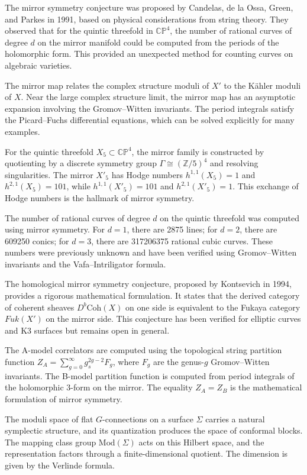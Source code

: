The mirror symmetry conjecture was proposed by Candelas, de la Ossa, Green, and Parkes in 1991, based on physical considerations from string theory. They observed that for the quintic threefold in $\mathbb{CP}^4$, the number of rational curves of degree $d$ on the mirror manifold could be computed from the periods of the holomorphic form. This provided an unexpected method for counting curves on algebraic varieties.

The mirror map relates the complex structure moduli of $X'$ to the K\"ahler moduli of $X$. Near the large complex structure limit, the mirror map has an asymptotic expansion involving the Gromov--Witten invariants. The period integrals satisfy the Picard--Fuchs differential equations, which can be solved explicitly for many examples.

For the quintic threefold $X_5 \subset \mathbb{CP}^4$, the mirror family is constructed by quotienting by a discrete symmetry group $\Gamma \cong (\mathbb{Z}/5)^4$ and resolving singularities. The mirror $X'_5$ has Hodge numbers $h^{1,1}(X_5) = 1$ and $h^{2,1}(X_5) = 101$, while $h^{1,1}(X'_5) = 101$ and $h^{2,1}(X'_5) = 1$. This exchange of Hodge numbers is the hallmark of mirror symmetry.

The number of rational curves of degree $d$ on the quintic threefold was computed using mirror symmetry. For $d = 1$, there are 2875 lines; for $d = 2$, there are 609250 conics; for $d = 3$, there are 317206375 rational cubic curves. These numbers were previously unknown and have been verified using Gromov--Witten invariants and the Vafa--Intriligator formula.

The homological mirror symmetry conjecture, proposed by Kontsevich in 1994, provides a rigorous mathematical formulation. It states that the derived category of coherent sheaves $D^b\text{Coh}(X)$ on one side is equivalent to the Fukaya category $Fuk(X')$ on the mirror side. This conjecture has been verified for elliptic curves and K3 surfaces but remains open in general.

The A-model correlators are computed using the topological string partition function $Z_A = \sum_{g=0}^\infty g_s^{2g-2} F_g$, where $F_g$ are the genus-$g$ Gromov--Witten invariants. The B-model partition function is computed from period integrals of the holomorphic 3-form on the mirror. The equality $Z_A = Z_B$ is the mathematical formulation of mirror symmetry.

The moduli space of flat $G$-connections on a surface $\Sigma$ carries a natural symplectic structure, and its quantization produces the space of conformal blocks. The mapping class group $\text{Mod}(\Sigma)$ acts on this Hilbert space, and the representation factors through a finite-dimensional quotient. The dimension is given by the Verlinde formula.

